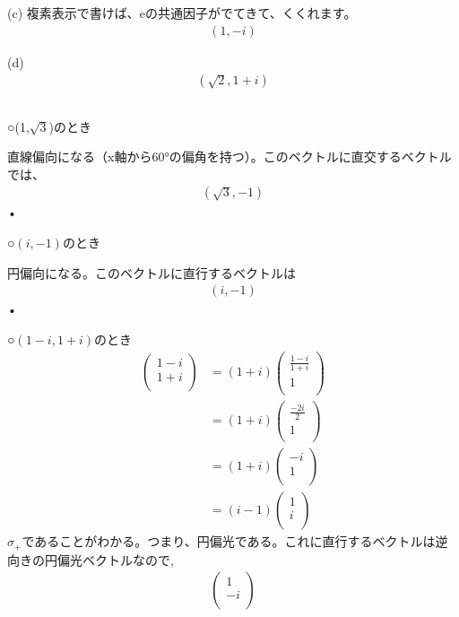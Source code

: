 \documentclass{jsarticle}
\begin{document}
(c)
複素表示で書けば、eの共通因子がでてきて、くくれます。
\begin{align}
(1,-i)
\end{align}


(d)
\begin{align}
(\sqrt{2} , 1+i)
\end{align}


\subsection{}
○(1,$\sqrt{3}$)のとき


直線偏向になる（x軸から60°の偏角を持つ）。このベクトルに直交するベクトルでは、
\begin{align}
(\sqrt{3},-1)
\end{align}•


○$(i,-1)$のとき


円偏向になる。このベクトルに直行するベクトルは
\begin{align}
(i,-1)
\end{align}•


○$(1-i,1+i)$のとき
\begin{align}
 \left(
    \begin{array}{c}
      1-i \\
      1+i \\     
    \end{array}
  \right)
&= (1+i) \left(
    \begin{array}{c}
      \frac{1-i}{1+i} \\
      1 \\     
    \end{array}
  \right) \\
&=(1+i) \left(
    \begin{array}{c}
      \frac{-2i}{2} \\
      1 \\     
    \end{array}
  \right) \\
&=(1+i) \left(
    \begin{array}{c}
      -i \\
      1 \\     
    \end{array}
  \right) \\
&= (i-1) \left(
    \begin{array}{c}
      1 \\
      i \\     
    \end{array}
  \right)
\end{align}
$\sigma_+$であることがわかる。つまり、円偏光である。これに直行するベクトルは逆向きの円偏光ベクトルなので,
\begin{align}
\left(
    \begin{array}{c}
      1 \\
     - i \\     
    \end{array}
  \right)
\end{align}
\end{document}
